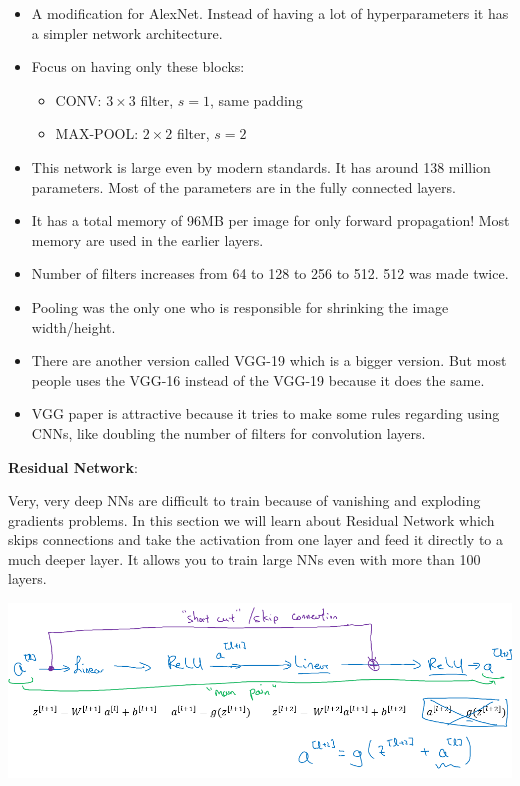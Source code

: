 \documentclass{article}
\begin{document}
\begin{itemize}
    \item A modification for AlexNet. Instead of having a lot of hyperparameters it has a simpler network architecture.
    \item Focus on having only these blocks:
    \begin{itemize}
        \item CONV: \(3 \times 3\) filter, \(s = 1\), same padding
        \item MAX-POOL: \(2 \times 2\) filter, \(s = 2\)
    \end{itemize}
    \item This network is large even by modern standards. It has around 138 million parameters. Most of the parameters are in the fully connected layers.
    \item It has a total memory of 96MB per image for only forward propagation! Most memory are used in the earlier layers.
    \item Number of filters increases from 64 to 128 to 256 to 512. 512 was made twice.
    \item Pooling was the only one who is responsible for shrinking the image width/height.
    \item There are another version called VGG-19 which is a bigger version. But most people uses the VGG-16 instead of the VGG-19 because it does the same.
    \item VGG paper is attractive because it tries to make some rules regarding using CNNs, like doubling the number of filters for convolution layers.
\end{itemize}

\noindent \textbf{Residual Network}:

\noindent Very, very deep NNs are difficult to train because of vanishing and exploding gradients problems. In this section we will learn about Residual Network which skips connections and take the activation from one layer and feed it directly to a much deeper layer. It allows you to train large NNs even with more than 100 layers.

\begin{center}
\includegraphics[scale=0.4]{./images/resnet_fp.png}
\end{center}
\end{document}
